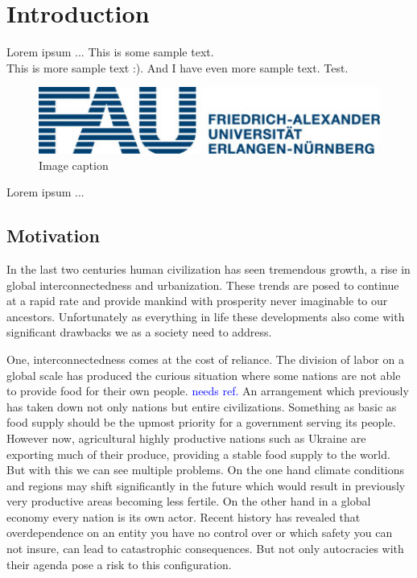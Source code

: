 \chapter{Introduction}
\label{chap:Introduction}

Lorem ipsum ...
This is some sample text.\\
This is more sample text :).
And I have even more sample text.
Test.
%
\begin{figure}[H]
	\centering
	\includegraphics[width=1\textwidth]{img/FAU}
	\caption{Image caption}
	\label{Image_Label}
\end{figure}
%
\noindent
%
Lorem ipsum ...

\section{Motivation}
\label{sec:Motivation}
In the last two centuries human civilization has seen tremendous growth, a rise in global interconnectedness and urbanization.
These trends are posed to continue at a rapid rate and provide mankind with prosperity never imaginable to our ancestors.
Unfortunately as everything in life these developments also come with significant drawbacks we as a society need to address.

One, interconnectedness comes at the cost of reliance.
The division of labor on a global scale has produced the curious situation where some nations are not able to provide food for their own people. \textcolor{blue}{needs ref.}
An arrangement which previously has taken down not only nations but entire civilizations.
Something as basic as food supply should be the upmost priority for a government serving its people.
However now, agricultural highly productive nations such as Ukraine are exporting much of their produce, providing a stable food supply to the world.
But with this we can see multiple problems.
On the one hand climate conditions and regions may shift significantly in the future which would result in previously very productive areas becoming less fertile.
On the other hand in a global economy every nation is its own actor.
Recent history has revealed that overdependence on an entity you have no control over or which safety you can not insure, can lead to catastrophic consequences.
But not only autocracies with their agenda pose a risk to this configuration.

